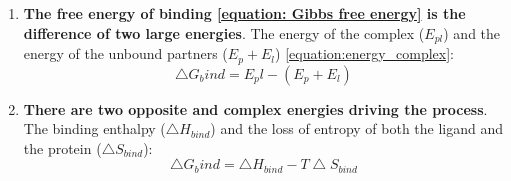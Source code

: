 \documentclass[12pt, a4paper,twoside]{tesi_upf}
\begin{document}
\begin{enumerate}
\item \textbf{The free energy of binding \ref{equation: Gibbs free energy} is the difference of two large energies}. The energy of the complex ($E_{pl}$) and the energy of the unbound partners ($E_{p} + E_{l}$) \ref{equation:energy_complex}: 
\begin{equation}\label{equation:energy_complex}
\bigtriangleup G_bind=E_pl - (E_{p} + E_{l}) 
\end{equation}
\item \textbf{There are two opposite and complex energies driving the process}. The binding enthalpy ($\bigtriangleup H_{bind}$) and the loss of entropy of both the ligand and the protein ($\bigtriangleup S_{bind}$): 
\begin{equation}\label{equation:energy_enthalpy_entropy}
\bigtriangleup G_bind= \bigtriangleup H_{bind} -  T\bigtriangleup S_{bind} 
\end{equation}


\end{enumerate}
\end{document}
